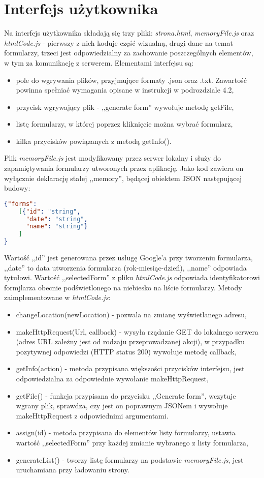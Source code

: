 \section{Interfejs użytkownika}%
Na interfejs użytkownika składają się trzy pliki: \textit{strona.html}, \textit{memoryFile.js} oraz \textit{htmlCode.js} - pierwszy z nich koduje część wizualną, drugi dane na temat formularzy, trzeci jest odpowiedzialny za zachowanie poszczególnych elementów, w tym za komunikację z serwerem. 
\ind Elementami interfejsu są:
\begin{itemize}
\item pole do wgrywania plików, przyjmujące formaty .json oraz .txt. Zawartość powinna spełniać wymagania opisane w instrukcji w podrozdziale 4.2, %
\item przycisk wgrywający plik - ,,generate form'' wywołuje metodę getFile,
\item listę formularzy, w której poprzez kliknięcie można wybrać formularz,
\item kilka przycisków powiązanych z metodą getInfo().
\end{itemize}
\ind Plik \textit{memoryFile.js} jest modyfikowany przez serwer lokalny i służy do zapamiętywania formularzy utworonych przez aplikację. Jako kod zawiera on wyłącznie deklarację stałej ,,memory'', będącej obiektem JSON następującej budowy:
\begin{lstlisting}[language=json,firstnumber=1]
{"forms":
    [{"id": "string",
      "date": "string",
      "name": "string"}
    ]
}
\end{lstlisting}
Wartość ,,id'' jest generowana przez usługę Google'a przy tworzeniu formularza, ,,date'' to data utworzenia formularza (rok-miesiąc-dzień), ,,name'' odpowiada tytułowi.
\ind Wartość ,,selectedForm'' z pliku \textit{htmlCode.js} odpowiada identyfikatorowi formjlarza obecnie podświetlonego na niebiesko na liście formularzy. Metody zaimplementowane w \textit{htmlCode.js}:
\begin{itemize}
\item changeLocation(newLocation) - pozwala na zmianę wyświetlanego adresu,
\item makeHttpRequest(Url, callback) - wysyła rządanie GET do lokalnego serwera (adres URL zależny jest od rodzaju przeprowadzanej akcji), w przypadku pozytywnej odpowiedzi (HTTP status 200) wywołuje metodę callback,
\item getInfo(action) - metoda przypisana większości przycisków interfejsu, jest odpowiedzialna za odpowiednie wywołanie makeHttpRequest,
\item getFile() - funkcja przypisana do przycisku ,,Generate form'', wczytuje wgrany plik, sprawdza, czy jest on poprawnym JSONem i wywołuje makeHttpRequest z odpowiednimi argumentami.
\item assign(id) - metoda przypisana do elementów listy formularzy, ustawia wartość ,,selectedForm'' przy każdej zmianie wybranego z listy formularza,
\item generateList() - tworzy listę formularzy na podstawie \textit{memoryFile.js}, jest uruchamiana przy ładowaniu strony.
\end{itemize}

